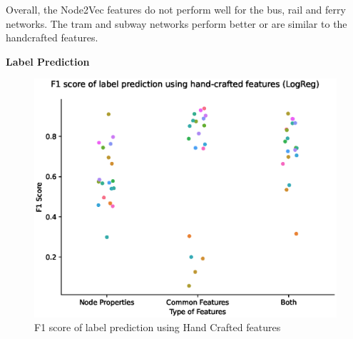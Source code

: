 \documentclass{article}
\theoremstyle{plain}
\theoremstyle{definition}
\theoremstyle{remark}
\begin{document}
Overall, the Node2Vec features do not perform well for the bus, rail and ferry networks. The tram and subway networks perform better or are similar to the handcrafted features.

\textbf{Label Prediction}

\begin{figure}[ht]
\vskip -0.1in
\begin{center}
\centerline{\includegraphics[width=\columnwidth]{images/label-pred-all_combined.eps}}
\caption{F1 score of label prediction using Hand Crafted features}
\label{label-pred-hc_fig}
\end{center}
\vskip -0.3in
\end{figure}


\end{document}
